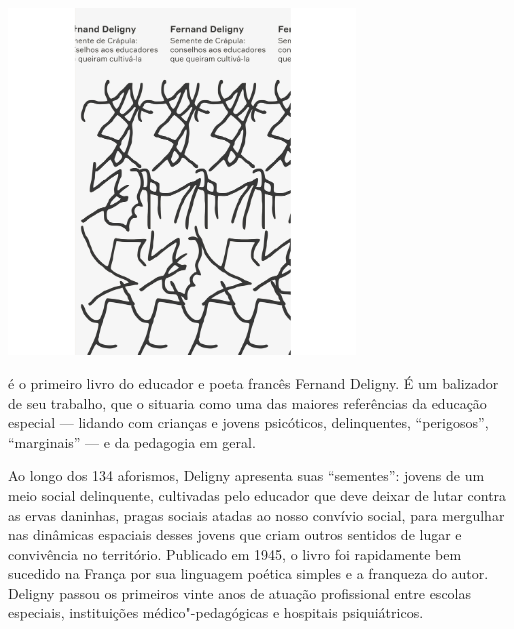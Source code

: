 \begin{center}
\hspace*{.5cm}\includegraphics[width=92mm]{./grid/deligny.png}
\end{center}

\hspace*{-7cm}\hrulefill\hspace*{-7cm}

\medskip

 é o primeiro livro do educador e poeta francês Fernand Deligny. É um balizador de seu trabalho, que o situaria como uma das maiores referências da educação especial --- lidando com crianças e jovens psicóticos, delinquentes, “perigosos”, “marginais” --- e da pedagogia em geral.

Ao longo dos 134 aforismos, Deligny apresenta suas “sementes”: jovens de um meio social delinquente, cultivadas pelo educador que deve deixar de lutar contra as ervas daninhas, pragas sociais atadas ao nosso convívio social, para mergulhar nas dinâmicas espaciais desses jovens que criam outros sentidos de lugar e convivência no território. Publicado em 1945, o livro foi rapidamente bem sucedido na França por sua linguagem poética simples e a franqueza do autor. Deligny passou os primeiros vinte anos de atuação profissional entre escolas especiais, instituições médico"-pedagógicas e hospitais psiquiátricos.

\vfill

\hspace*{-.4cm}\begin{minipage}[c]{.5\linewidth}
\small{
{}}
\end{minipage}


